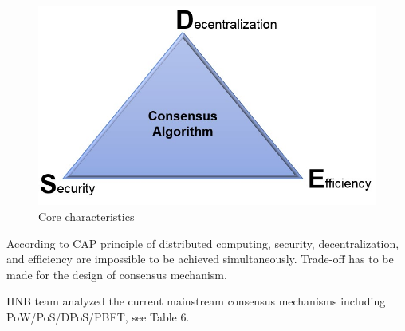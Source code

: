 \documentclass[fleqn,10pt]{SelfArx} %
\begin{document}
\begin{figure}[ht]\centering
\includegraphics[width=\linewidth]{25}
\caption{Core characteristics}
\label{fig:25}
\end{figure}
According to CAP principle of distributed computing, security, decentralization, and efficiency are impossible to be achieved simultaneously. Trade-off has to be made for the design of consensus mechanism.

HNB team analyzed the current mainstream consensus mechanisms including PoW/PoS/DPoS/PBFT, see Table 6. 
\end{document}
